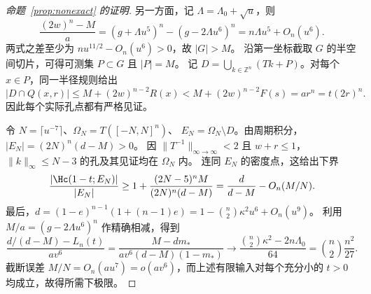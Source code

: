 \begin{proof}[命题~\ref{prop:nonexact} 的证明]
另一方面，记 \(\Lambda=\Lambda_0+\sqrt u\)，则
\[
 \frac{(2w)^n-M}{a}
 =(g+\Lambda u^5)^n-(g-2\Lambda u^6)^n
 =n\Lambda u^5+O_n(u^6).
\]
两式之差至少为 \(nu^{11/2}-O_n(u^6)>0\)，故 \(|G|>M\)。
沿第一坐标截取 \(G\) 的半空间切片，可得可测集 \(P\subset G\) 且 \(|P|=M\)。
记 \(D=\bigcup_{k\in\mathbb Z^n}(Tk+P)\)。对每个 \(x\in P\)，同一半径规则给出
\[
 |D\cap Q(x,r)|\le M+(2w)^{n-2}R(x)
 <M+(2w)^{n-2}F(s)=a r^n=t(2r)^n .
\]
因此每个实际孔点都有严格见证。

令 \(N=\lceil u^{-7}\rceil\)、\(\Omega_N=T([-N,N]^n)\)、
\(E_N=\Omega_N\setminus D\)。由周期积分，\(|E_N|=(2N)^n(d-M)>0\)。
因 \(\|T^{-1}\|_{\infty\to\infty}<2\) 且 \(w+r\le1\)，
\(\|k\|_\infty\le N-3\) 的孔及其见证均在 \(\Omega_N\) 内。
连同 \(E_N\) 的密度点，这给出下界
\[
 \frac{|\Hc(1-t;E_N)|}{|E_N|}
 \ge 1+\frac{(2N-5)^n M}{(2N)^n(d-M)}
 =\frac d{d-M}-O_n(M/N).
\]
最后，\(d=(1-e)^{n-1}(1+(n-1)e)=1-\binom n2\kappa^2u^6+O_n(u^9)\)。
利用 \(M/a=(g-2\Lambda u^6)^n\) 作精确相减，得到
\[
 \frac{d/(d-M)-L_n(t)}{a v^6}
 =\frac{M-dm_*}{a v^6(d-M)(1-m_*)}
 \longrightarrow
 \frac{\binom n2\kappa^2-2n\Lambda_0}{64}
 =\binom n2\frac{n^2}{27}.
\]
截断误差 \(M/N=O_n(au^7)=o(av^6)\)，而上述有限输入对每个充分小的
\(t>0\) 均成立，故得所需下极限。
\end{proof}
